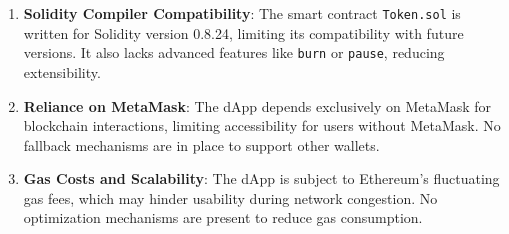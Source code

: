 \documentclass[../main.tex]{subfiles}
\begin{document}
\begin{enumerate}
    \item \textbf{Solidity Compiler Compatibility}: The smart contract \texttt{Token.sol} is written for Solidity version 0.8.24, limiting its compatibility with future versions. It also lacks advanced features like \texttt{burn} or \texttt{pause}, reducing extensibility.

    \item \textbf{Reliance on MetaMask}: The dApp depends exclusively on MetaMask for blockchain interactions, limiting accessibility for users without MetaMask. No fallback mechanisms are in place to support other wallets.

    \item \textbf{Gas Costs and Scalability}: The dApp is subject to Ethereum's fluctuating gas fees, which may hinder usability during network congestion. No optimization mechanisms are present to reduce gas consumption.
   

\end{enumerate}
\end{document}
